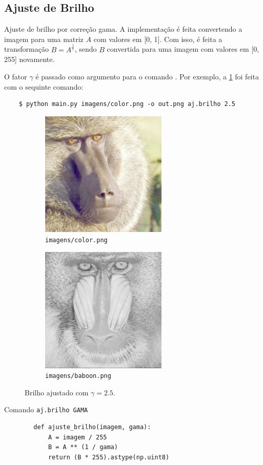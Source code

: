 \subsection{Ajuste de Brilho}

Ajuste de brilho por correção gama. A implementação é feita convertendo a imagem para uma matriz $A$ com valores em [0, 1]. Com isso, é feita a transformação $B = A^{\frac{1}{\gamma}}$,
sendo $B$ convertida para uma imagem com valores em [0, 255] novamente.

O fator $\gamma$ é passado como argumento para o comando . Por exemplo, a \cref{fig:ajbrilho} foi feita com o sequinte comando:

\begin{verbatim}
    $ python main.py imagens/color.png -o out.png aj.brilho 2.5
\end{verbatim}

\begin{figure}[H]
    \centering
    \begin{subfigure}{0.45\textwidth}
        \centering
        \includegraphics[width=6cm]{resultados/colorgama.png}
        \caption{\texttt{imagens/color.png}}
        \label{fig:ajbrilho}
    \end{subfigure}%
    \begin{subfigure}{0.45\textwidth}
        \centering
        \includegraphics[width=6cm]{resultados/baboongama.png}
        \caption{\texttt{imagens/baboon.png}}
    \end{subfigure}

    \caption{Brilho ajustado com $\gamma = 2.5$.}
\end{figure}

\begin{listing}[H]
    \caption{Comando \texttt{aj.brilho GAMA}}

    \begin{verbatim}
        def ajuste_brilho(imagem, gama):
            A = imagem / 255
            B = A ** (1 / gama)
            return (B * 255).astype(np.uint8)
    \end{verbatim}
\end{listing}
